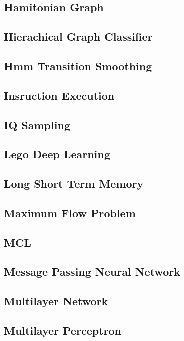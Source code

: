 \documentclass{article}
\newcommand{\example}[1]{
\resizebox{\linewidth}{!}{

}

}
\begin{document}
\subsection{Hamitonian Graph}
\example{hamiltonian_graph}
\subsection{Hierachical Graph Classifier}
\example{hierarchical_graph_classifier}

\subsection{Hmm Transition Smoothing}
\example{hmm_transition_smoothing}
\subsection{Insruction Execution}
\example{instruction_execution}
\subsection{IQ Sampling}
\example{iq_sampling}
\subsection{Lego Deep Learning}
\example{lego_deep_learning}
\subsection{Long Short Term Memory}
\example{long_short-term_memory}
\subsection{Maximum Flow Problem}
\example{maximum_flow_problem}
\subsection{MCL}
\example{mcl}
\subsection{Message Passing Neural Network}
\example{message_passing_neural_network}
\subsection{Multilayer Network}
\example{multilayer_network}

\subsection{Multilayer Perceptron}
\example{multilayer_perceptron}
\end{document}
